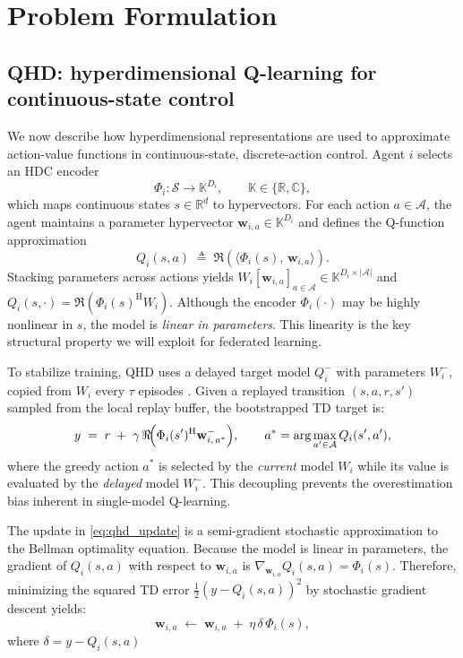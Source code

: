 


\section{Problem Formulation}
\label{subsec:problem_formulation}
\subsection{QHD: hyperdimensional Q-learning for continuous-state control}
We now describe how hyperdimensional representations are used to approximate action-value functions in continuous-state, discrete-action control. Agent $i$ selects an HDC encoder
\begin{equation}
\Phi_i:\mathcal{S}\to\mathbb{K}^{D_i},
\qquad \mathbb{K}\in\{\mathbb{R},\mathbb{C}\},
\label{eq:phi_i}
\end{equation}
which maps continuous states $s\in\mathbb{R}^{d}$ to hypervectors. For each action $a\in\mathcal{A}$, the agent maintains a parameter hypervector $\mathbf{w}_{i,a}\in\mathbb{K}^{D_i}$ and defines the Q-function approximation
\begin{equation}
Q_i(s,a) \;\triangleq\; \Re\!\left(\langle \Phi_i(s),\,\mathbf{w}_{i,a}\rangle\right).
\label{eq:qhd_q}
\end{equation}
Stacking parameters across actions yields $W_i [\mathbf{w}_{i,a}]_{a\in\mathcal{A}}\in\mathbb{K}^{D_i\times|\mathcal{A}|}$ and $Q_i(s,\cdot)=\Re(\Phi_i(s)^{\mathrm{H}} W_i)$. Although the encoder $\Phi_i(\cdot)$ may be highly nonlinear in $s$,
the model is \emph{linear in parameters}. This linearity is the key structural property we will exploit for federated learning.


To stabilize training, QHD uses a delayed target model
$Q_i^-$ with parameters $W_i^-$, copied from $W_i$ every
$\tau$ episodes \citep{ni2022qhd}. Given a replayed transition
$(s,a,r,s')$ sampled from the local replay buffer, the
bootstrapped TD target is:
\begin{equation}
    y
    \;=\;
    r \;+\; \gamma\,
    \Re\!\Bigl(\Phi_i(s')^{\mathrm{H}}
    \mathbf{w}^-_{i,\,a^*}\Bigr),
    \qquad
    a^* = \arg\max_{a'\in\mathcal{A}} Q_i(s',a'),
    \label{eq:target}
\end{equation}
where the greedy action $a^*$ is selected by the \emph{current}
model $W_i$ while its value is evaluated by the \emph{delayed}
model $W_i^-$. This decoupling prevents the overestimation
bias inherent in single-model Q-learning.


The update in \eqref{eq:qhd_update} is a semi-gradient
stochastic approximation to the Bellman optimality equation.
Because the model is linear in parameters,
the gradient of $Q_i(s,a)$ with respect to $\mathbf w_{i,a}$ is
$\nabla_{\mathbf w_{i,a}} Q_i(s,a) = \Phi_i(s)$.
Therefore, minimizing the squared TD error
$\tfrac12 (y - Q_i(s,a))^2$
by stochastic gradient descent yields:
\begin{equation}
    \mathbf{w}_{i,a}
    \;\leftarrow\;
    \mathbf{w}_{i,a}
    \;+\;
    \eta\,\delta\,\Phi_i(s),
    \label{eq:qhd_update}
\end{equation}
where $\delta = y - Q_i(s,a)$




